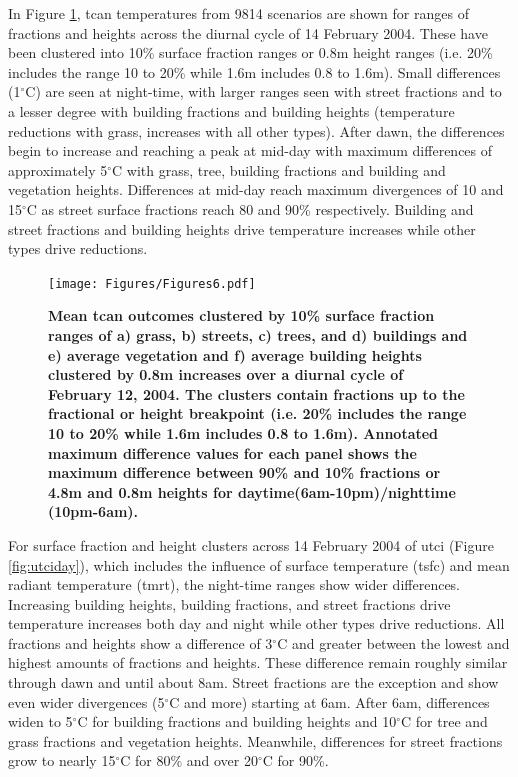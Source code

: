 \documentclass[final,3p,times,authoryear]{elsarticle}
\begin{document}
In Figure \ref{fig:tcanday}, \gls{tcan} temperatures from 9814 scenarios are shown for ranges of fractions and heights across the diurnal cycle of 14 February 2004. These have been clustered into 10\% surface fraction ranges or 0.8m height ranges (i.e. 20\% includes the range 10 to 20\%  while 1.6m includes 0.8 to 1.6m). Small differences (1$^{\circ}$C) are seen at night-time, with larger ranges seen with street fractions and to a lesser degree with building fractions and building heights (temperature reductions with grass, increases with all other types). After dawn, the differences begin to increase and reaching a peak at mid-day with maximum differences of approximately 5$^{\circ}$C with grass, tree, building fractions and building and vegetation heights. Differences at mid-day reach maximum divergences of 10 and 15$^{\circ}$C as street surface fractions reach 80 and 90\% respectively. Building and street fractions and building heights drive temperature increases while other types drive reductions.

\begin{figure}
\centering
\texttt{[image: Figures/Figures6.pdf]}
\caption{\bf Mean \gls{tcan} outcomes clustered by 10\% surface fraction ranges of a) grass, b) streets, c) trees, and d) buildings and e) average vegetation and f) average building heights clustered by 0.8m increases over a diurnal cycle of February 12, 2004. The clusters contain fractions up to the fractional or height breakpoint (i.e. 20\% includes the range 10 to 20\%  while 1.6m includes 0.8 to 1.6m). Annotated maximum difference values for each panel shows the maximum difference between 90\% and 10\% fractions or 4.8m and 0.8m heights for daytime(6am-10pm)/nighttime (10pm-6am). }
 \label{fig:tcanday}
\end{figure}

For surface fraction and height clusters across 14 February 2004 of \gls{utci} (Figure \ref{fig:utciday}), which includes the influence of surface temperature (\gls{tsfc}) and mean radiant temperature (\gls{tmrt}), the night-time ranges show wider differences. Increasing building heights, building fractions, and street fractions drive temperature increases both day and night while other types drive reductions. All fractions and heights show a difference of 3$^{\circ}$C and greater between the lowest and highest amounts of fractions and heights. These difference remain roughly similar through dawn and until about 8am. Street fractions are the exception and show even wider divergences (5$^{\circ}$C and more) starting at 6am. After 6am, differences widen to 5$^{\circ}$C for building fractions and building heights and 10$^{\circ}$C for tree and grass fractions and vegetation heights. Meanwhile, differences for street fractions grow to nearly 15$^{\circ}$C for 80\% and over 20$^{\circ}$C for 90\%.
\end{document}
